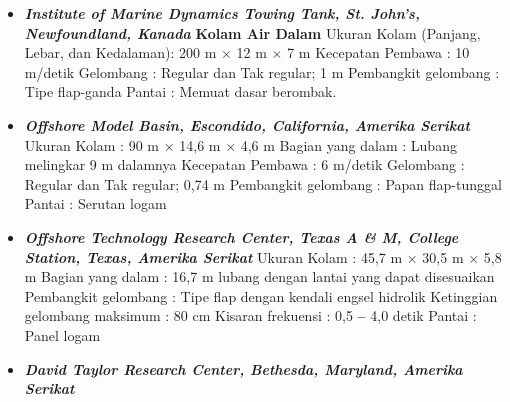 \documentclass[12pt,a4paper]{report}
\begin{document}
\begin{itemize}
\item[\textbf{a.}]  \textbf{\textit{Institute of Marine Dynamics Towing
Tank, St. John's, Newfoundland, Kanada}} \newline
\textbf{Kolam Air Dalam}\newline
Ukuran Kolam (Panjang, Lebar, dan Kedalaman): 200 m $\times$ 12 m $\times$ 7
m\newline
Kecepatan Pembawa : 10 m/detik\newline
Gelombang : Regular dan Tak regular; 1 m\newline
Pembangkit gelombang : Tipe flap-ganda\newline
Pantai : Memuat dasar berombak.

\item[\textbf{b.}]  \textbf{\textit{Offshore Model Basin, Escondido,
California, Amerika Serikat}}\newline
Ukuran Kolam : 90 m $\times$ 14,6 m $\times$ 4,6 m\newline
Bagian yang dalam : Lubang melingkar 9 m dalamnya\newline
Kecepatan Pembawa : 6 m/detik \newline
Gelombang : Regular dan Tak regular; 0,74 m \newline
Pembangkit gelombang : Papan flap-tunggal\newline
Pantai : Serutan logam

\item[\textbf{c.}]  \textbf{\textit{Offshore Technology Research Center,
Texas A \& M, College Station, Texas, Amerika Serikat}}\newline
Ukuran Kolam : 45,7 m $\times$ 30,5 m $\times$ 5,8 m\newline
Bagian yang dalam : 16,7 m lubang dengan lantai yang dapat disesuaikan%
\newline
Pembangkit gelombang : Tipe flap dengan kendali engsel hidrolik\newline
Ketinggian gelombang maksimum : 80 cm\newline
Kisaran frekuensi : 0,5 \textbf{--} 4,0 detik\newline
Pantai : Panel logam

\item[\textbf{d.}]  \textbf{\textit{David Taylor Research Center, Bethesda,
Maryland, Amerika Serikat}}

\end{itemize}
\end{document}
